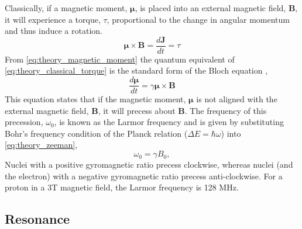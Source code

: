 Classically, if a magnetic moment, $\bm{\mu}$, is placed into an external magnetic field, $\mathbf{B}$, it will experience a torque, $\tau$, proportional to the change in angular momentum and thus induce a rotation.
\begin{equation}
\bm{\mu} \times \mathbf{B} = \frac{d\mathbf{J}}{dt} = \tau
\label{eq:theory_classical_torque}
\end{equation}
From \eqref{eq:theory_magnetic_moment} the quantum equivalent of \eqref{eq:theory_classical_torque} is the standard form of the Bloch equation \cite{bloch_nuclear_1946},
\begin{equation}
\frac{d\bm{\mu}}{dt} = \gamma \bm{\mu} \times \mathbf{B}
\label{eq:theory_bloch_standard}
\end{equation}
This equation states that if the magnetic moment, $\bm{\mu}$ is not aligned with the external magnetic field, $\mathbf{B}$, it will precess about $\mathbf{B}$. The frequency of this precession, $\omega_0$, is known as the Larmor frequency and is given by substituting Bohr's frequency condition of the Planck relation ($\Delta E = \hbar \omega $) into \eqref{eq:theory_zeeman},
\begin{equation}
\omega_0=\gamma B_0,
\label{eq:theory_larmor}
\end{equation}
Nuclei with a positive gyromagnetic ratio precess clockwise, whereas nuclei (and the electron) with a negative gyromagnetic ratio precess anti-clockwise. For a proton in a 3T magnetic field, the Larmor frequency is 128 MHz.

\subsection{Resonance}

